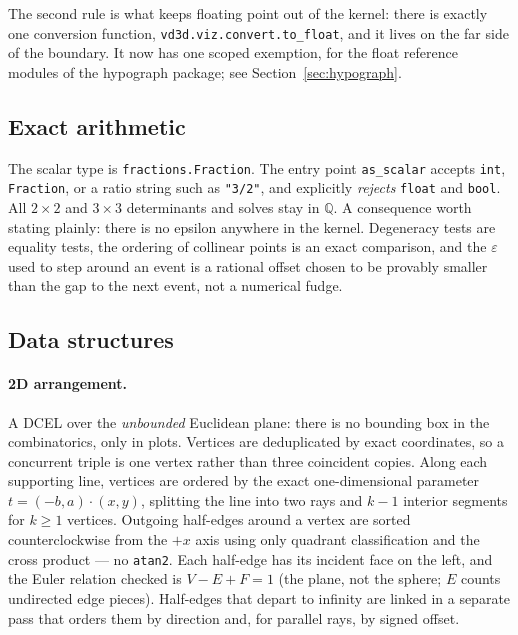 \documentclass[11pt]{article}
\begin{document}
The second rule is what keeps floating point out of the kernel: there is
exactly one conversion function, \texttt{vd3d.viz.convert.to\_float}, and it
lives on the far side of the boundary.  It now has one scoped exemption, for
the float reference modules of the hypograph package; see
Section~\ref{sec:hypograph}.

\subsection{Exact arithmetic}

The scalar type is \texttt{fractions.Fraction}.  The entry point
\texttt{as\_scalar} accepts \texttt{int}, \texttt{Fraction}, or a ratio string
such as \texttt{"3/2"}, and explicitly \emph{rejects} \texttt{float} and
\texttt{bool}.  All $2\times2$ and $3\times3$ determinants and solves stay in
$\mathbb{Q}$.  A consequence worth stating plainly: there is no epsilon
anywhere in the kernel.  Degeneracy tests are equality tests, the ordering of
collinear points is an exact comparison, and the $\varepsilon$ used to step
around an event is a rational offset chosen to be provably smaller than the gap
to the next event, not a numerical fudge.

\subsection{Data structures}

\paragraph{2D arrangement.}
A DCEL over the \emph{unbounded} Euclidean plane: there is no bounding box in
the combinatorics, only in plots.  Vertices are deduplicated by exact
coordinates, so a concurrent triple is one vertex rather than three coincident
copies.  Along each supporting line, vertices are ordered by the exact
one-dimensional parameter $t = (-b, a)\cdot(x,y)$, splitting the line into two
rays and $k-1$ interior segments for $k \ge 1$ vertices.  Outgoing half-edges
around a vertex are sorted counterclockwise from the $+x$ axis using only
quadrant classification and the cross product --- no \texttt{atan2}.  Each
half-edge has its incident face on the left, and the Euler relation checked is
$V - E + F = 1$ (the plane, not the sphere; $E$ counts undirected edge pieces).
Half-edges that depart to infinity are linked in a separate pass that orders
them by direction and, for parallel rays, by signed offset.
\end{document}
